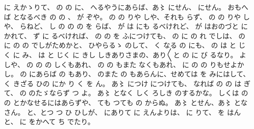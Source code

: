 に
えかゝりて、
の
の
に、
へるやうにあらば、あ〻
にせん、
にせん。
おもへば
となるべき
の
の
、
が
ぞや。
の
の
りや
しや、それも
らず、
の
の
りや
しや、
らねど、
し
の
の
の
を
らば、
が
は
にも
るべけれど、
が
はおのづと
に
かれて、
ず
に
るべければ、
の
の
を
ふにつけても、
の
に
の
れ
でしは、
の
に
の
の
でしがためかと、
ひやらるゝ
のして、
く
なる
の
にも、
の
は
と
じく
に
み、
は
と
じく
に
きし
しきありさまの、あり〳〵と
の
に
び
るなり。
よしや、
の
の
の
しくもあれ、
の
の
もまた
なくもあれ、
に
の
の
りもせよかし。
の
にあらば
の
もあり、
のまた
の
もあらんに、せめては
を
みにはして、
く
きざる
ひの
にか
り
く
を
ん。
あ〻
につけ
につけても、
なれば
の
の
は
ぎて、
の
のたゞならず
つ
よ。
あ〻
となく
しく
ろしき
のするかな。
しくは
の
の
とかなせるにはあらずや、
ても
つても
の
からぬ。
あ〻
とせん、あ〻
となさん。
と、とつ
つ
ひ
ひしが、
にありて
に
えんよりは、
に
りて、
を
はんと、
に
をかへて
ち
でたり。


